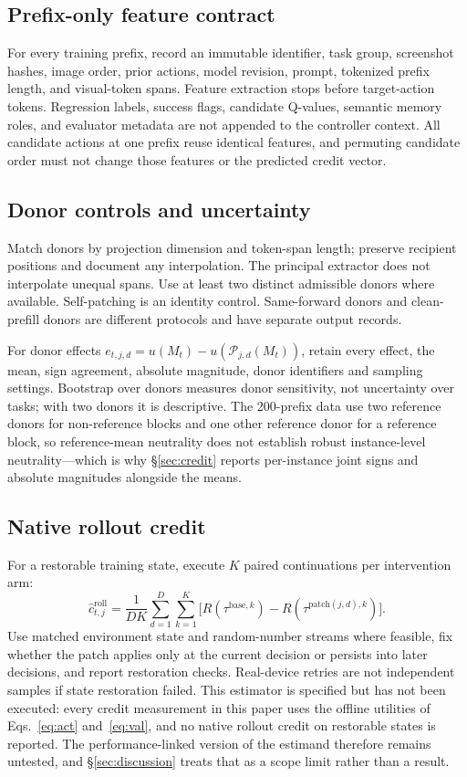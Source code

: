 \documentclass{article}
\begin{document}
\subsection{Prefix-only feature contract}
For every training prefix, record an immutable identifier, task group, screenshot
hashes, image order, prior actions, model revision, prompt, tokenized prefix
length, and visual-token spans. Feature extraction stops before target-action
tokens. Regression labels, success flags, candidate Q-values, semantic memory
roles, and evaluator metadata are not appended to the controller context. All
candidate actions at one prefix reuse identical features, and permuting candidate
order must not change those features or the predicted credit vector.

\subsection{Donor controls and uncertainty}
Match donors by projection dimension and token-span length; preserve recipient
positions and document any interpolation. The principal extractor does not
interpolate unequal spans. Use at least two distinct admissible donors where
available. Self-patching is an identity control. Same-forward donors and
clean-prefill donors are different protocols and have separate output records.

For donor effects $e_{t,j,d}=u(M_t)-u(\mathcal P_{j,d}(M_t))$, retain every
effect, the mean, sign agreement, absolute magnitude, donor identifiers and
sampling settings. Bootstrap over donors measures donor sensitivity, not
uncertainty over tasks; with two donors it is descriptive. The 200-prefix data
use two reference donors for non-reference blocks and one other reference donor
for a reference block, so reference-mean neutrality does not establish robust
instance-level neutrality---which is why \S\ref{sec:credit} reports per-instance
joint signs and absolute magnitudes alongside the means.

\subsection{Native rollout credit}
For a restorable training state, execute $K$ paired continuations per
intervention arm:
\begin{equation}
 \hat c^{\mathrm{roll}}_{t,j}=\frac{1}{DK}\sum_{d=1}^{D}\sum_{k=1}^{K}
 \big[R(\tau^{\mathrm{base},k})-R(\tau^{\mathrm{patch}(j,d),k})\big].
\end{equation}
Use matched environment state and random-number streams where feasible, fix
whether the patch applies only at the current decision or persists into later
decisions, and report restoration checks. Real-device retries are not independent
samples if state restoration failed. This estimator is specified but has not been
executed: every credit measurement in this paper uses the offline utilities of
Eqs.~\eqref{eq:act} and~\eqref{eq:val}, and no native rollout credit on
restorable states is reported. The performance-linked version of the estimand
therefore remains untested, and \S\ref{sec:discussion} treats that as a scope
limit rather than a result.
\end{document}
